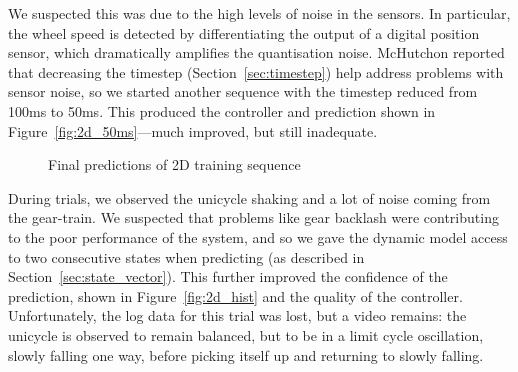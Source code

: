 \documentclass{IIBproject}
\begin{document}
We suspected this was due to the high levels of noise in the sensors. In
particular, the wheel speed is detected by differentiating the output of a
digital position sensor, which dramatically amplifies the quantisation
noise. McHutchon reported that decreasing the timestep
(Section~\ref{sec:timestep}) help address problems with sensor noise, so we
started another sequence with the timestep reduced from 100ms to 50ms. This
produced the controller and prediction shown in
Figure~\ref{fig:2d_50ms}---much improved, but still inadequate.

\begin{figure}[htpb]
  \begin{center}
    \end{center}
    \caption{Final predictions of 2D training sequence}
    \label{fig:2d_predictions}
    \end{figure}

During trials, we observed the unicycle shaking and a lot of noise coming
from the gear-train. We suspected that problems like gear backlash were
contributing to the poor performance of the system, and so we gave the dynamic
model access to two consecutive states when predicting (as described in
Section~\ref{sec:state_vector}). This further improved the confidence of the
prediction, shown in Figure~\ref{fig:2d_hist} and the quality of the
controller. Unfortunately, the log data for this trial was lost, but a video
remains: the unicycle is observed to remain balanced, but to be in a limit
cycle oscillation, slowly falling one way, before picking itself up and
returning to slowly falling.
\end{document}
